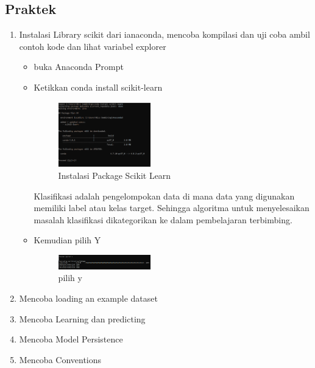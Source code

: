\subsection{Praktek}
\begin{enumerate}
	\item Instalasi Library scikit dari ianaconda, mencoba kompilasi dan uji coba ambil contoh kode dan lihat variabel explorer
    \hfill\break
    \begin{itemize}
		\item buka Anaconda Prompt
		\hfill\break
		\item Ketikkan conda install scikit-learn
		\begin{figure}[H]
            \includegraphics[width=4cm]{figures/1174096/1/install1.PNG}
            \centering
            \caption{Instalasi Package Scikit Learn}
        \end{figure}
		\hfill\break
		Klasifikasi adalah pengelompokan data di mana data yang digunakan memiliki label atau kelas target. Sehingga algoritma untuk menyelesaikan masalah klasifikasi dikategorikan ke dalam pembelajaran terbimbing.
		\item Kemudian pilih Y
		\begin{figure}[H]
            \includegraphics[width=4cm]{figures/1174096/1/install2.PNG}
            \centering
            \caption{pilih y}
        \end{figure}
	\end{itemize}
	
	\item Mencoba loading an example dataset
	\hfill\break
	
	\item Mencoba Learning dan predicting
	\hfill\break
	
	\item Mencoba Model Persistence
	\hfill\break
	
	\item Mencoba Conventions
	\hfill\break
	
\end{enumerate}
